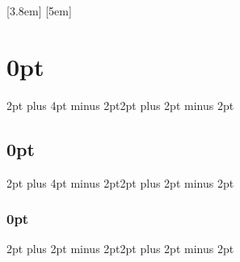 \newenvironment{snippet}[1][Usage Example]{
\vspace{3mm plus0mm minus3mm}
\large \textbf{#1}
\vspace{2mm}
\hrule
\vspace{3mm}
\small
}{
\vspace{8mm plus0mm minus3mm}
}

%
\usepackage[headheight=12pt,top=0.7in, bottom=0.9in, left=0.5in, 
right=0.5in]{geometry}
\usepackage{fancyhdr}
\usepackage{multicol}
\usepackage[keeplastbox]{flushend}
\usepackage{titletoc}
\usepackage[raggedright]{titlesec}

\usepackage[activate={true,nocompatibility},final,tracking=true,kerning=true,
spacing=true,factor=1100,stretch=10,shrink=10]{microtype}

\setlength\columnsep{5mm}
\setlength{\parindent}{0mm}
\setlength{\parskip}{1.5mm plus1mm minus1mm}

\setcounter{tocdepth}{2}
[3.8em]
{\vspace{-.3em}}
{\contentslabel{2.3em}}
{\hspace*{-2.3em}}
{\contentspage}
[5em]
{\vspace{-.3em}}
{\contentslabel{2.3em}}
{\hspace*{-2.3em}}
{\contentspage}

\titlespacing\section{0pt}{2pt plus 4pt minus 2pt}{2pt plus 2pt minus 2pt}
\titlespacing\subsection{0pt}{2pt plus 4pt minus 2pt}{2pt plus 2pt minus 
2pt}
\titlespacing\subsubsection{0pt}{2pt plus 2pt minus 2pt}{2pt plus 2pt minus 
2pt}

\pagestyle{fancy}
\lhead[]{}
\chead{}
\rhead[]{}
\rfoot[]{{\sffamily \textbf{\thepage}}}
\cfoot{}
\lfoot[{\sffamily \textbf{\thepage}}]{}
\renewcommand{\headrulewidth}{0.0pt}
\renewcommand{\footrulewidth}{0.0pt}

